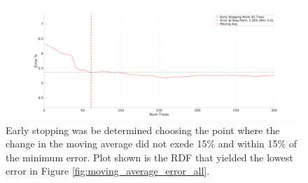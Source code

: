 \documentclass[numbered,pdftex]{ohio-etd}
\begin{document}
{		\begin{figure}[H]
			\centering
			\includegraphics[width=1\linewidth]{Defense_Images/MLS_200D_early_stopping}
			\caption[Early Stopping]{Early stopping was be determined choosing the point where the change in the moving average did not exede 15\% and within 15\% of the minimum error. Plot shown is the RDF that yielded the lowest error in Figure \ref{fig:moving_average_error_all}.}
			\label{fig:early_stopping_xyz_100D}
		\end{figure}
	
		
}
\end{document}
